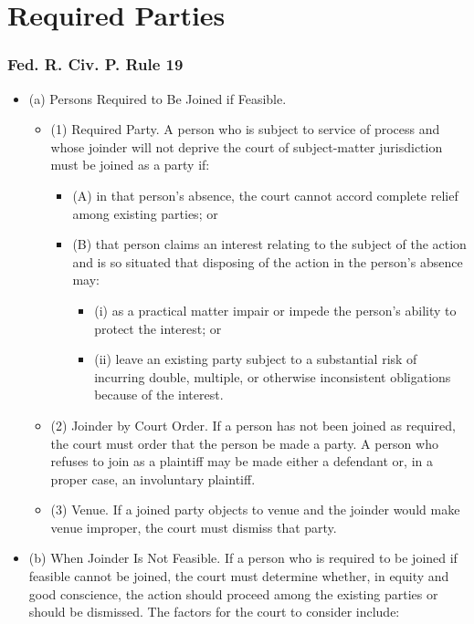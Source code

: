\documentclass[11pt,letterpaper,twoside]{article}
\providecommand{\tightlist}{%
\setlength{\itemsep}{0em}\setlength{\parskip}{0em}\setlength{\itemindent}{0em}}
\begin{document}
\section{Required Parties}\label{required-parties}

\subsubsection{Fed. R. Civ. P. Rule 19}\label{fedciv_rule19}

\begin{itemize}
\tightlist
\item
  (a) Persons Required to Be Joined if Feasible.

  \begin{itemize}
  \tightlist
  \item
    (1) Required Party. A person who is subject to service of process
    and whose joinder will not deprive the court of subject-matter
    jurisdiction must be joined as a party if:

    \begin{itemize}
    \tightlist
    \item
      (A) in that person's absence, the court cannot accord complete
      relief among existing parties; or
    \item
      (B) that person claims an interest relating to the subject of the
      action and is so situated that disposing of the action in the
      person's absence may:

      \begin{itemize}
      \tightlist
      \item
        (i) as a practical matter impair or impede the person's ability
        to protect the interest; or
      \item
        (ii) leave an existing party subject to a substantial risk of
        incurring double, multiple, or otherwise inconsistent
        obligations because of the interest.
      \end{itemize}
    \end{itemize}
  \item
    (2) Joinder by Court Order. If a person has not been joined as
    required, the court must order that the person be made a party. A
    person who refuses to join as a plaintiff may be made either a
    defendant or, in a proper case, an involuntary plaintiff.
  \item
    (3) Venue. If a joined party objects to venue and the joinder would
    make venue improper, the court must dismiss that party.
  \end{itemize}
\item
  (b) When Joinder Is Not Feasible. If a person who is required to be
  joined if feasible cannot be joined, the court must determine whether,
  in equity and good conscience, the action should proceed among the
  existing parties or should be dismissed. The factors for the court to
  consider include:


\end{itemize}
\end{document}
